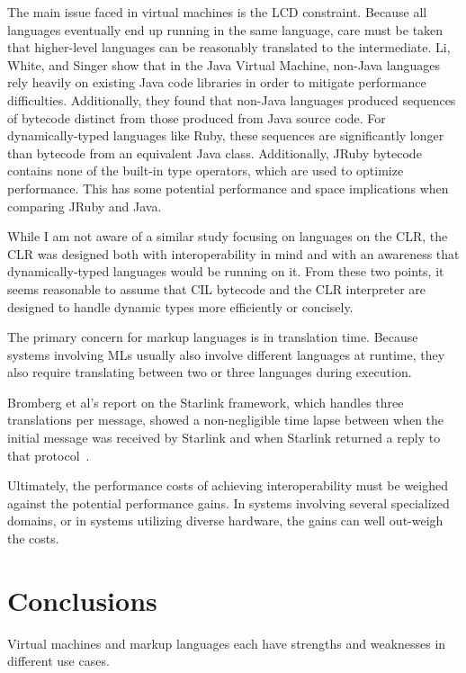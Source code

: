 \documentclass{sig-alternate}
\begin{document}
The main issue faced in virtual machines is the LCD constraint. Because all languages eventually end up running in the same language, care must be taken that higher-level languages can be reasonably translated to the intermediate.
Li, White, and Singer \cite{Li:2013} show that in the Java Virtual Machine, non-Java languages rely heavily on existing Java code libraries in order to mitigate performance difficulties. Additionally, they found that non-Java languages produced sequences of bytecode distinct from those produced from Java source code.
For dynamically-typed languages like Ruby, these sequences are significantly longer than bytecode from an equivalent Java class. Additionally, JRuby bytecode contains none of the built-in type operators, which are used to optimize performance. This has some potential performance and space implications when comparing JRuby and Java.


While I am not aware of a similar study focusing on languages on the CLR, the CLR was designed both with interoperability in mind and with an awareness that dynamically-typed languages would be running on it. From these two points, it seems reasonable to assume that CIL bytecode and the CLR interpreter are designed to handle dynamic types more efficiently or concisely.


The primary concern for markup languages is in translation time. Because systems involving MLs usually also involve different languages at runtime, they also require translating between two or three languages during execution.

Bromberg et al's report on the Starlink framework, which handles three translations per message, showed a non-\linebreak negligible time lapse between when the initial message was received by Starlink and when Starlink returned a reply to that protocol~\cite{Bromberg:2011}.

Ultimately, the performance costs of achieving interoperability must be weighed against the potential performance gains. In systems involving several specialized domains, or in systems utilizing diverse hardware, the gains can well out-weigh the costs.



\section{Conclusions}


Virtual machines and markup languages each have strengths and weaknesses in different use cases.
\end{document}
